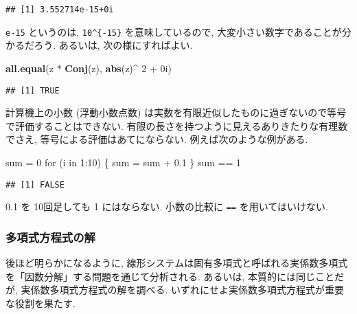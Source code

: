 \documentclass[a4paper]{scrbook}
\newenvironment{Shaded}{\begin{snugshade}}{\end{snugshade}}
\newcommand{\KeywordTok}[1]{\textcolor[rgb]{0.13,0.29,0.53}{\textbf{{#1}}}}
\newcommand{\DecValTok}[1]{\textcolor[rgb]{0.00,0.00,0.81}{{#1}}}
\newcommand{\FloatTok}[1]{\textcolor[rgb]{0.00,0.00,0.81}{{#1}}}
\newcommand{\StringTok}[1]{\textcolor[rgb]{0.31,0.60,0.02}{{#1}}}
\newcommand{\NormalTok}[1]{{#1}}
\theoremstyle{definition}
\begin{document}
\begin{verbatim}
## [1] 3.552714e-15+0i
\end{verbatim}

\texttt{e-15} というのは, \texttt{10\^{}\{-15\}} を意味しているので,
大変小さい数字であることが分かるだろう. あるいは, 次の様にすればよい.

\begin{Shaded}
\begin{Highlighting}[]
\KeywordTok{all.equal}\NormalTok{(z *}\StringTok{ }\KeywordTok{Conj}\NormalTok{(z), }\KeywordTok{abs}\NormalTok{(z)^}\StringTok{ }\DecValTok{2} \NormalTok{+}\StringTok{ }\NormalTok{0i)}
\end{Highlighting}
\end{Shaded}

\begin{verbatim}
## [1] TRUE
\end{verbatim}

計算機上の小数 (浮動小数点数)
は実数を有限近似したものに過ぎないので等号で評価することはできない.
有限の長さを持つように見えるありきたりな有理数でさえ,
等号による評価はあてにならない. 例えば次のような例がある.　

\begin{Shaded}
\begin{Highlighting}[]
\NormalTok{sum =}\StringTok{ }\DecValTok{0}
\NormalTok{for (i in }\DecValTok{1}\NormalTok{:}\DecValTok{10}\NormalTok{) \{}
  \NormalTok{sum =}\StringTok{ }\NormalTok{sum +}\StringTok{ }\FloatTok{0.1}
\NormalTok{\}}
\NormalTok{sum ==}\StringTok{ }\DecValTok{1}
\end{Highlighting}
\end{Shaded}

\begin{verbatim}
## [1] FALSE
\end{verbatim}

0.1 を 10回足しても 1 にはならない. 小数の比較に \texttt{==}
を用いてはいけない.

\subsubsection*{多項式方程式の解}

後ほど明らかになるように,
線形システムは固有多項式と呼ばれる実係数多項式を「因数分解」する問題を通じて分析される.
あるいは, 本質的には同じことだが, 実係数多項式方程式の解を調べる.
いずれにせよ実係数多項式方程式が重要な役割を果たす.
\end{document}
